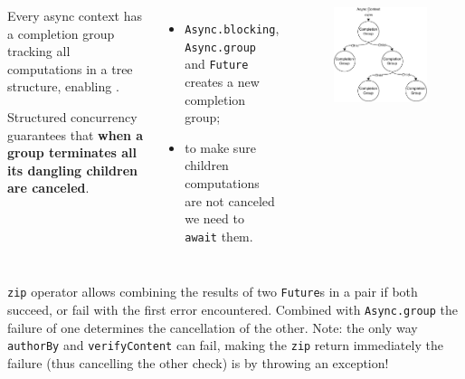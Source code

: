 \documentclass[aspectratio=1610,xcolor=dvipsnames,handout]{beamer}
\begin{document}
%
\begin{frame}
  \begin{columns}
      \begin{block}{}
        Every async context has a completion group tracking all computations in a tree structure, enabling . 

        Structured concurrency guarantees that \textbf{when a group terminates all its dangling children are canceled}.
      \end{block}
      \begin{itemize}
        \item \texttt{Async.blocking}, \texttt{Async.group} and \texttt{Future} creates a new completion group;
        \item to make sure children computations are not canceled we need to \texttt{await} them.
      \end{itemize}
      \begin{figure}
        \centering
        \includegraphics[width=\textwidth]{./images/structured-concurrency.pdf}
      \end{figure}
  \end{columns}
\end{frame}
%
\begin{frame}
  \small
  
  \texttt{zip} operator allows combining the results of two \texttt{Future}s in a pair if both succeed, or fail with the first error encountered. Combined with \texttt{Async.group} the failure of one determines the cancellation of the other.
  Note: the only way \texttt{authorBy} and \texttt{verifyContent} can fail, making the \texttt{zip} return immediately the failure (thus cancelling the other check) is by throwing an exception!
\end{frame}
\end{document}
